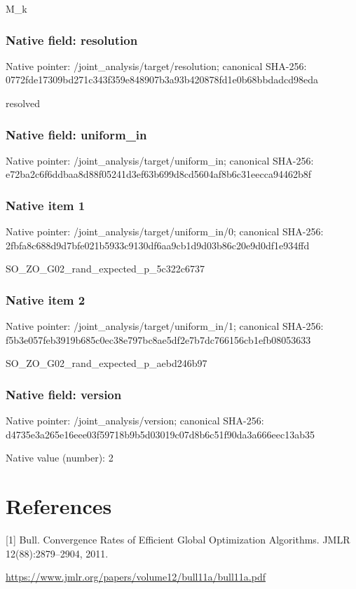 \documentclass[10pt,a4paper]{article}
\begin{document}
\begingroup\raggedright\sloppy M\_\allowbreak{}k\par\endgroup

\subsubsection{Native field: resolution}
Native pointer: /joint\_\allowbreak{}analysis/target/resolution; canonical SHA-256: 0772fde17309bd271c343f359e848907b3a93b420878fd1e0b68bbdadcd98eda

\begingroup\raggedright\sloppy resolved\par\endgroup

\subsubsection{Native field: uniform\_\allowbreak{}in}
Native pointer: /joint\_\allowbreak{}analysis/target/uniform\_\allowbreak{}in; canonical SHA-256: e72ba2c6f6ddbaa8d88f05241d3ef63b699d8cd5604af8b6c31eecca94462b8f

\subsubsection{Native item 1}
Native pointer: /joint\_\allowbreak{}analysis/target/uniform\_\allowbreak{}in/0; canonical SHA-256: 2fbfa8c688d9d7bfe021b5933c9130df6aa9cb1d9d03b86c20e9d0df1e934ffd

\begingroup\raggedright\sloppy SO\_\allowbreak{}ZO\_\allowbreak{}G02\_\allowbreak{}rand\_\allowbreak{}expected\_\allowbreak{}p\_\allowbreak{}5c322c6737\par\endgroup

\subsubsection{Native item 2}
Native pointer: /joint\_\allowbreak{}analysis/target/uniform\_\allowbreak{}in/1; canonical SHA-256: f5b3e057feb3919b685c0ec38e797bc8ae5df2e7b7dc766156cb1efb08053633

\begingroup\raggedright\sloppy SO\_\allowbreak{}ZO\_\allowbreak{}G02\_\allowbreak{}rand\_\allowbreak{}expected\_\allowbreak{}p\_\allowbreak{}aebd246b97\par\endgroup

\subsubsection{Native field: version}
Native pointer: /joint\_\allowbreak{}analysis/version; canonical SHA-256: d4735e3a265e16eee03f59718b9b5d03019c07d8b6c51f90da3a666eec13ab35

Native value (number): 2

\section{References}
[1] Bull. Convergence Rates of Efficient Global Optimization Algorithms. JMLR 12(88):2879--2904, 2011.

\url{https://www.jmlr.org/papers/volume12/bull11a/bull11a.pdf}
\end{document}
